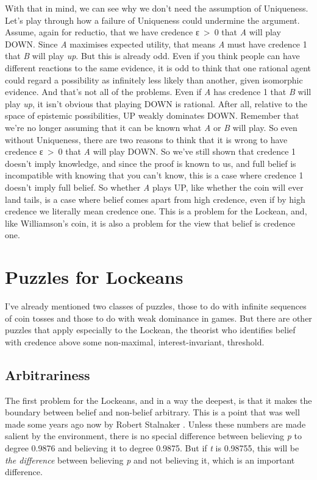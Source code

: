 \documentclass[
  11pt,
]{book}
\begin{document}
With that in mind, we can see why we don't need the assumption of Uniqueness. Let's play through how a failure of Uniqueness could undermine the argument. Assume, again for reductio, that we have credence ε~\textgreater~0 that \emph{A} will play DOWN. Since \emph{A} maximises expected utility, that means \emph{A} must have credence 1 that \emph{B} will play \emph{up}. But this is already odd. Even if you think people can have different reactions to the same evidence, it is odd to think that one rational agent could regard a possibility as infinitely less likely than another, given isomorphic evidence. And that's not all of the problems. Even if \emph{A} has credence 1 that \emph{B} will play \emph{up}, it isn't obvious that playing DOWN is rational. After all, relative to the space of epistemic possibilities, UP weakly dominates DOWN. Remember that we're no longer assuming that it can be known what \emph{A} or \emph{B} will play. So even without Uniqueness, there are two reasons to think that it is wrong to have credence ε~\textgreater~0 that \emph{A} will play DOWN. So we've still shown that credence 1 doesn't imply knowledge, and since the proof is known to us, and full belief is incompatible with knowing that you can't know, this is a case where credence 1 doesn't imply full belief. So whether \emph{A} plays UP, like whether the coin will ever land tails, is a case where belief comes apart from high credence, even if by high credence we literally mean credence one. This is a problem for the Lockean, and, like Williamson's coin, it is also a problem for the view that belief is credence one.

\hypertarget{lockepuzzles}{%
\section{Puzzles for Lockeans}\label{lockepuzzles}}

I've already mentioned two classes of puzzles, those to do with infinite sequences of coin tosses and those to do with weak dominance in games. But there are other puzzles that apply especially to the Lockean, the theorist who identifies belief with credence above some non-maximal, interest-invariant, threshold.

\hypertarget{lockearb}{%
\subsection{Arbitrariness}\label{lockearb}}

The first problem for the Lockeans, and in a way the deepest, is that it makes the boundary between belief and non-belief arbitrary. This is a point that was well made some years ago now by Robert Stalnaker \citeyearpar[ 91]{Stalnaker1984}. Unless these numbers are made salient by the environment, there is no special difference between believing \emph{p} to degree 0.9876 and believing it to degree 0.9875. But if \emph{t} is 0.98755, this will be \emph{the difference} between believing \emph{p} and not believing it, which is an important difference.
\end{document}
